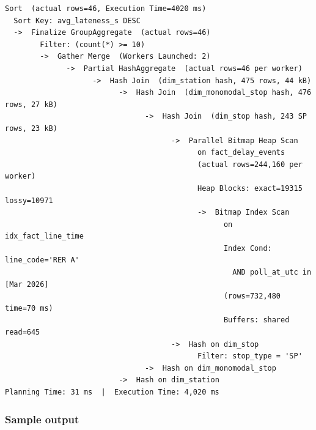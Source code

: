 \documentclass[a4paper,11pt]{article}
\begin{document}
\begin{lstlisting}[style=explain,
  caption={EXPLAIN (ANALYZE, BUFFERS) output for Q7: RER A, March 2026.
    Execution time: 4,020\,ms (cold cache).
    Key: \texttt{idx\_fact\_line\_time} is hit in 70\,ms; the three
    dimension-table hashes are each $<$1\,ms.},
  label=lst:q7-plan]
Sort  (actual rows=46, Execution Time=4020 ms)
  Sort Key: avg_lateness_s DESC
  ->  Finalize GroupAggregate  (actual rows=46)
        Filter: (count(*) >= 10)
        ->  Gather Merge  (Workers Launched: 2)
              ->  Partial HashAggregate  (actual rows=46 per worker)
                    ->  Hash Join  (dim_station hash, 475 rows, 44 kB)
                          ->  Hash Join  (dim_monomodal_stop hash, 476 rows, 27 kB)
                                ->  Hash Join  (dim_stop hash, 243 SP rows, 23 kB)
                                      ->  Parallel Bitmap Heap Scan
                                            on fact_delay_events
                                            (actual rows=244,160 per worker)
                                            Heap Blocks: exact=19315 lossy=10971
                                            ->  Bitmap Index Scan
                                                  on idx_fact_line_time
                                                  Index Cond: line_code='RER A'
                                                    AND poll_at_utc in [Mar 2026]
                                                  (rows=732,480  time=70 ms)
                                                  Buffers: shared read=645
                                      ->  Hash on dim_stop
                                            Filter: stop_type = 'SP'
                                ->  Hash on dim_monomodal_stop
                          ->  Hash on dim_station
Planning Time: 31 ms  |  Execution Time: 4,020 ms
\end{lstlisting}

\subsubsection{Sample output}
\end{document}
